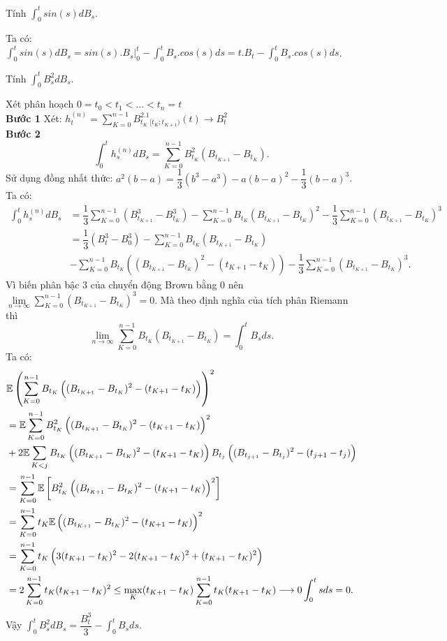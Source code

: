 \begin{exam*}
Tính $\displaystyle \int_0^tsin(s)dB_s$.
\begin{sol*}
    Ta có: $\displaystyle \int_0^tsin(s)dB_s = sin(s).B_s\Big|_0^t-\displaystyle \int_0^tB_s.cos(s)ds = t.B_t-\displaystyle \int_0^tB_s.cos(s)ds$.
\end{sol*}
\end{exam*}
\begin{exam*}
Tính $\displaystyle \int_0^tB_s^2dB_s$.
\begin{sol*}
Xét phân hoạch $0=t_0<t_1<...<t_n=t$\\
    \textbf{Bước 1} Xét: $h_t^{(n)} = \displaystyle\sum\limits_{K=0}^{n-1}B_{t_K}^2.1_{[t_K; t_{K+1})}(t) \longrightarrow B_t^2$\\
   \textbf{Bước 2} \[\displaystyle \int_0^t h_s^{(n)}dB_s = \sum\limits_{K=0}^{n-1}B_{t_K}^2(B_{t_{K+1}}-B_{t_K}).\] Sử dụng đồng nhất thức: $a^2(b-a)=\dfrac{1}{3}(b^3-a^3)-a(b-a)^2-\dfrac{1}{3}(b-a)^3$. Ta có:
\begin{align*}
    \displaystyle \int_0^t h_s^{(n)}dB_s 
    &= \dfrac{1}{3}\sum\limits_{K=0}^{n-1}(B_{t_{K+1}}^3-B_{t_K}^3) - \sum\limits_{K=0}^{n-1}B_{t_K}(B_{t_{K+1}}-B_{t_K})^2-\dfrac{1}{3}\sum\limits_{K=0}^{n-1}(B_{t_{K+1}}-B_{t_K})^3\\
    &=\dfrac{1}{3}(B_t^3-B_0^3)-\sum\limits_{K=0}^{n-1}B_{t_K}(B_{t_{K+1}}-B_{t_K})\\
    &-\sum\limits_{K=0}^{n-1}B_{t_K}\left((B_{t_{K+1}}-B_{t_K})^2-(t_{K+1}-t_K)\right)
   -\dfrac{1}{3}\sum\limits_{K=0}^{n-1}(B_{t_{K+1}}-B_{t_K})^3.
\end{align*}
Vì biến phân bậc 3 của chuyển động Brown bằng 0 nên $\lim\limits_{n \to \infty} \sum\limits_{K=0}^{n-1}(B_{t_{K+1}}-B_{t_K})^3 = 0 $. Mà theo định nghĩa của tích phân Riemann thì \[\lim\limits_{n \to \infty} \sum\limits_{K=0}^{n-1}B_{t_K}(B_{t_{K+1}}-B_{t_K}) = \displaystyle \int_0^tB_sds.\]
Ta có: 
\begin{align*}
    &\mathbb{E} \left(\sum\limits_{K=0}^{n-1}B_{t_K}\left((B_{t_{K+1}}-B_{t_K})^2-(t_{K+1}-t_K)\right)\right)^2\\
    &=\mathbb{E} \sum\limits_{K=0}^{n-1}B_{t_K}^2 \left((B_{t_{K+1}}-B_{t_K})^2-(t_{K+1}-t_K)\right)^2\\
    &+ 2\mathbb{E}\sum\limits_{K<j}B_{t_K}\left((B_{t_{K+1}}-B_{t_K})^2-(t_{K+1}-t_K)\right)B_{t_j}\left((B_{t_{j+1}}-B_{t_j})^2-(t_{j+1}-t_j)\right)\\
    &= \sum\limits_{K=0}^{n-1} \mathbb{E} \left[B_{t_K}^2\left((B_{t_{K+1}}-B_{t_K})^2-(t_{K+1}-t_K)\right)^2\right]\\
    &= \sum\limits_{K=0}^{n-1} t_K \mathbb{E} \left((B_{t_{K+1}}-B_{t_K})^2-(t_{K+1}-t_K)\right)^2 \\
    &= \sum\limits_{K=0}^{n-1} t_K \left(3(t_{K+1}-t_K)^2-2(t_{K+1}-t_K)^2+(t_{K+1}-t_K)^2\right)\\
    &= 2 \sum\limits_{K=0}^{n-1} t_K (t_{K+1}-t_K)^2 \leq \max\limits_K (t_{K+1}-t_K)\sum\limits_{K=0}^{n-1} t_K(t_{K+1}-t_K) \longrightarrow 0 \displaystyle \int_0^t sds = 0.
\end{align*}
Vậy $\displaystyle \int_0^t B_s^2dB_s = \dfrac{B_t^3}{3}-\displaystyle \int_0^t B_sds.$ 
\end{sol*}
\end{exam*}
